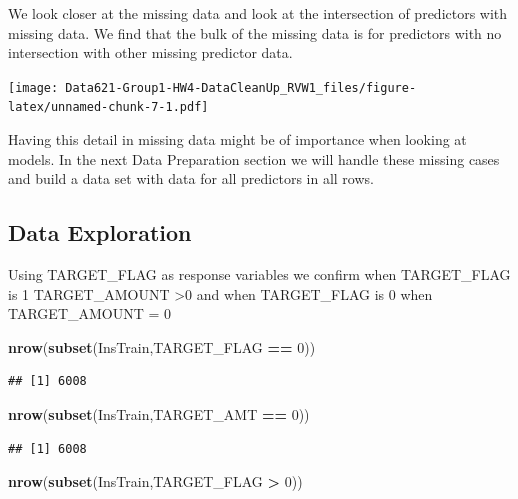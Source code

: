 \documentclass[]{article}
\newenvironment{Shaded}{\begin{snugshade}}{\end{snugshade}}
\newcommand{\KeywordTok}[1]{\textcolor[rgb]{0.13,0.29,0.53}{\textbf{#1}}}
\newcommand{\DecValTok}[1]{\textcolor[rgb]{0.00,0.00,0.81}{#1}}
\newcommand{\StringTok}[1]{\textcolor[rgb]{0.31,0.60,0.02}{#1}}
\newcommand{\OperatorTok}[1]{\textcolor[rgb]{0.81,0.36,0.00}{\textbf{#1}}}
\newcommand{\NormalTok}[1]{#1}
\begin{document}
We look closer at the missing data and look at the intersection of
predictors with missing data. We find that the bulk of the missing data
is for predictors with no intersection with other missing predictor
data.

\texttt{[image: Data621-Group1-HW4-DataCleanUp\_RVW1\_files/figure-latex/unnamed-chunk-7-1.pdf]}

Having this detail in missing data might be of importance when looking
at models. In the next Data Preparation section we will handle these
missing cases and build a data set with data for all predictors in all
rows.

\subsection{Data Exploration}\label{data-exploration-1}

Using TARGET\_FLAG as response variables we confirm when TARGET\_FLAG is
1 TARGET\_AMOUNT \textgreater{}0 and when TARGET\_FLAG is 0 when
TARGET\_AMOUNT = 0

\begin{Shaded}
\begin{Highlighting}[]
\KeywordTok{nrow}\NormalTok{(}\KeywordTok{subset}\NormalTok{(InsTrain,TARGET_FLAG }\OperatorTok{==}\StringTok{ }\DecValTok{0}\NormalTok{))}
\end{Highlighting}
\end{Shaded}

\begin{verbatim}
## [1] 6008
\end{verbatim}

\begin{Shaded}
\begin{Highlighting}[]
\KeywordTok{nrow}\NormalTok{(}\KeywordTok{subset}\NormalTok{(InsTrain,TARGET_AMT }\OperatorTok{==}\StringTok{ }\DecValTok{0}\NormalTok{))}
\end{Highlighting}
\end{Shaded}

\begin{verbatim}
## [1] 6008
\end{verbatim}

\begin{Shaded}
\begin{Highlighting}[]
\KeywordTok{nrow}\NormalTok{(}\KeywordTok{subset}\NormalTok{(InsTrain,TARGET_FLAG }\OperatorTok{>}\StringTok{ }\DecValTok{0}\NormalTok{))}
\end{Highlighting}
\end{Shaded}
\end{document}
